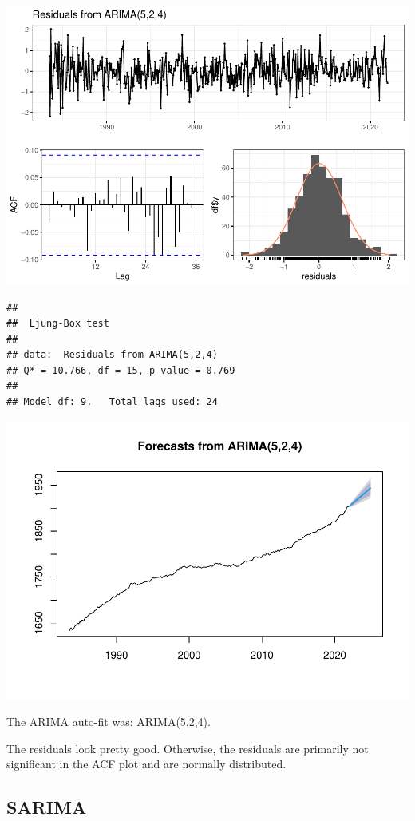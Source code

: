 \documentclass[
]{article}
\begin{document}
\includegraphics{Methane_Forecasting_files/figure-latex/unnamed-chunk-9-1.pdf}

\begin{verbatim}
## 
##  Ljung-Box test
## 
## data:  Residuals from ARIMA(5,2,4)
## Q* = 10.766, df = 15, p-value = 0.769
## 
## Model df: 9.   Total lags used: 24
\end{verbatim}

\includegraphics{Methane_Forecasting_files/figure-latex/unnamed-chunk-9-2.pdf}

The ARIMA auto-fit was: ARIMA(5,2,4).

The residuals look pretty good. Otherwise, the residuals are primarily
not significant in the ACF plot and are normally distributed.

\subsection{SARIMA}\label{sarima}
\end{document}
